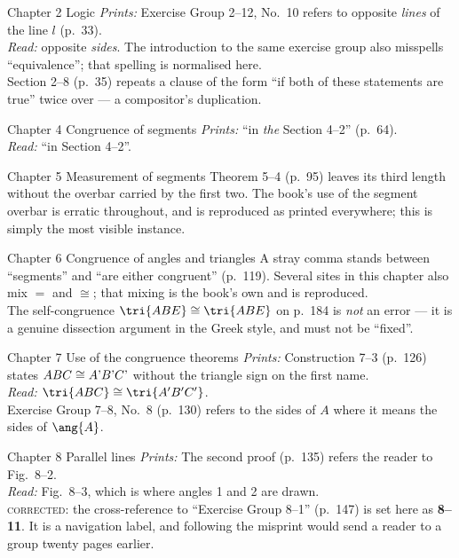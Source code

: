 \documentclass[11pt]{book}
\theoremstyle{bkplain}
\theoremstyle{XIplainnote}
\theoremstyle{bkplain}
\theoremstyle{bkplain}
\newcommand{\ERprints}[1]{\emph{Prints:} #1}
\newcommand{\ERmeans}[1]{\emph{Read:} #1}
\begin{document}
\begin{erratalist}

\item[Chapter 2 \quad Logic]
\ERprints{Exercise Group 2--12, No.~10 refers to opposite \emph{lines} of the
line $l$ (p.~33).}\\
\ERmeans{opposite \emph{sides}.} The introduction to the same exercise group
also misspells ``equivalence''; that spelling is normalised here.\\
Section 2--8 (p.~35) repeats a clause of the form ``if both of these
statements are true'' twice over --- a compositor's duplication.

\item[Chapter 4 \quad Congruence of segments]
\ERprints{``in \emph{the} Section 4--2'' (p.~64).}\\
\ERmeans{``in Section 4--2''.}

\item[Chapter 5 \quad Measurement of segments]
Theorem 5--4 (p.~95) leaves its third length without the overbar carried by
the first two. The book's use of the segment overbar is erratic throughout,
and is reproduced as printed everywhere; this is simply the most visible
instance.

\item[Chapter 6 \quad Congruence of angles and triangles]
A stray comma stands between ``segments'' and ``are either congruent''
(p.~119). Several sites in this chapter also mix $=$ and $\cong$; that
mixing is the book's own and is reproduced.\\
The self-congruence $\tri{ABE} \cong \tri{ABE}$ on p.~184 is \emph{not} an
error --- it is a genuine dissection argument in the Greek style, and must
not be ``fixed''.

\item[Chapter 7 \quad Use of the congruence theorems]
\ERprints{Construction 7--3 (p.~126) states $ABC \cong A\text{\textup{'}}B\text{\textup{'}}C\text{\textup{'}}$
without the triangle sign on the first name.}\\
\ERmeans{$\tri{ABC} \cong \tri{A'B'C'}$.}\\
Exercise Group 7--8, No.~8 (p.~130) refers to the sides of $A$ where it means
the sides of $\ang{A}$.

\item[Chapter 8 \quad Parallel lines]
\ERprints{The second proof (p.~135) refers the reader to Fig.~8--2.}\\
\ERmeans{Fig.~8--3, which is where angles 1 and 2 are drawn.}\\
\textsc{corrected}: the cross-reference to ``Exercise Group 8--1'' (p.~147)
is set here as \textbf{8--11}. It is a navigation label, and following the
misprint would send a reader to a group twenty pages earlier.


\end{erratalist}
\end{document}
